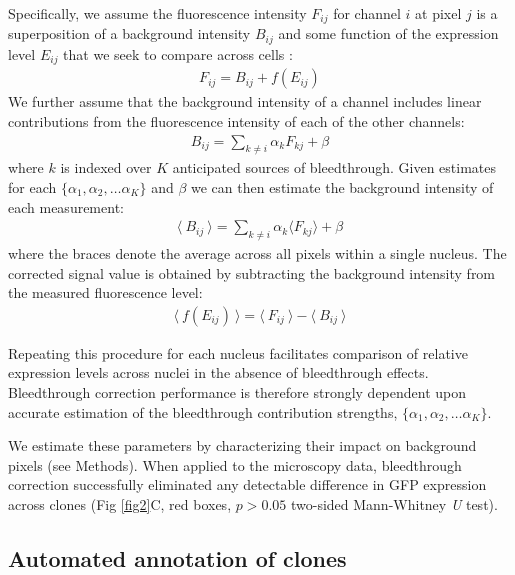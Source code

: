 \documentclass[10pt,letterpaper]{article}
\begin{document}
Specifically, we assume the fluorescence intensity $F_{ij}$ for channel $i$ at pixel $j$ is a superposition of a background intensity $B_{ij}$ and some function of the expression level $E_{ij}$ that we seek to compare across cells \cite{McMullen2010}:
\begin{eqnarray}
F_{ij} = B_{ij} + f(E_{ij})
\end{eqnarray}
We further assume that the background intensity of a channel includes linear contributions from the fluorescence intensity of each of the other channels:
\begin{eqnarray}
B_{ij} = \sum_{k \neq i}{\alpha_k F_{kj}} + \beta
\end{eqnarray}
where $k$ is indexed over $K$ anticipated sources of bleedthrough. Given estimates for each $\{\alpha_1, \alpha_2, \ldots \alpha_K\}$ and $\beta$ we can then estimate the background intensity of each measurement:
\begin{eqnarray} \label{eq:bg_model}
\langle\ B_{ij}\ \rangle = \sum_{k \neq i}{\alpha_k \langle F_{kj} \rangle} + \beta
\end{eqnarray}
where the braces denote the average across all pixels within a single nucleus. The corrected signal value is obtained by subtracting the background intensity from the measured fluorescence level:
\begin{eqnarray} \label{eq:correction}
\langle\ f(E_{ij}) \ \rangle = \langle\ F_{ij}\ \rangle - \langle\ B_{ij}\ \rangle
\end{eqnarray}

Repeating this procedure for each nucleus facilitates comparison of relative expression levels across nuclei in the absence of bleedthrough effects. Bleedthrough correction performance is therefore strongly dependent upon accurate estimation of the bleedthrough contribution strengths, $\{\alpha_1, \alpha_2, \ldots \alpha_K\}$. 

We estimate these parameters by characterizing their impact on background pixels (see Methods). When applied to the microscopy data, bleedthrough correction successfully eliminated any detectable difference in GFP expression across clones (Fig \ref{fig2}C, red boxes, $p>0.05$ two-sided Mann-Whitney \textit{U} test).


\subsection*{Automated annotation of clones}
\label{ch:annotation}
\end{document}
